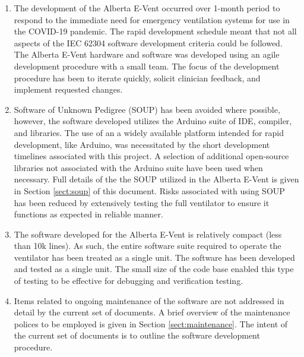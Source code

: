 \documentclass[]{article}
\begin{document}
\begin{center}
\begin{longtable}{ |p{1.3cm}| p{5.5cm}| p{0.7cm}| p{0.7cm}| p{0.7cm}| p{3.5cm}| }
	
\end{longtable}
\begin{enumerate}
	\item The development of the Alberta E-Vent occurred over 1-month period to respond to the immediate need for emergency ventilation systems for use in the COVID-19 pandemic.  The rapid development schedule meant that not all aspects of the IEC 62304 software development criteria could be followed.  The Alberta E-Vent hardware and software was developed using an agile development procedure with a small team.  The focus of the development procedure has been to iterate quickly, solicit clinician feedback, and implement requested changes.
	\item Software of Unknown Pedigree (SOUP) has been avoided where possible, however, the software developed utilizes the Arduino suite of IDE, compiler, and libraries.  The use of an a widely available platform intended for rapid development, like Arduino, was necessitated by the short development timelines associated with this project.  A selection of additional open-source libraries not associated with the Arduino suite have been used when necessary.  Full details of the the SOUP utilized in the Alberta E-Vent is given in Section \ref{sect:soup} of this document.  Risks associated with using SOUP has been reduced by extensively testing the full ventilator to ensure it functions as expected in reliable manner.
	\item The software developed for the Alberta E-Vent is relatively compact (less than 10k lines). As such, the entire  software suite required to operate the ventilator has been treated as a single unit.  The software has been developed and tested as a single unit. The small size of the code base enabled this type of testing to be effective for debugging and verification testing.
	\item Items related to ongoing maintenance of the software are not addressed in detail by the current set of documents.  A brief overview of the maintenance polices to be employed is given in Section \ref{sect:maintenance}. The intent of the current set of documents is to outline the software development procedure.
	
\end{enumerate}
\end{center}





\clearpage
\end{document}
